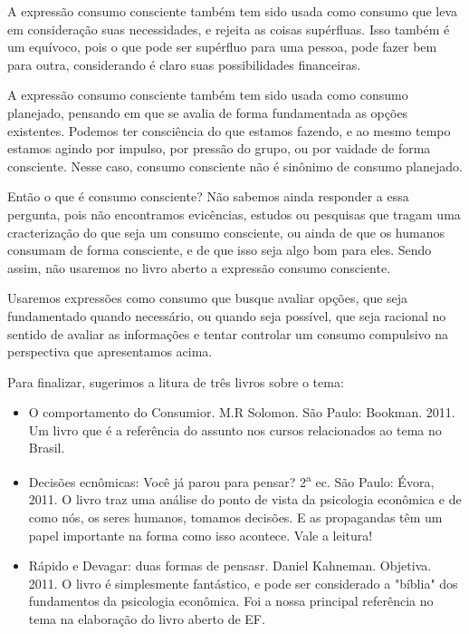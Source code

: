 \begin{paginatexto2}
\begin{itemize}
   A expressão consumo consciente também tem sido usada como consumo que leva em consideração suas necessidades, e rejeita as coisas supérfluas. Isso também é um equívoco, pois o que pode ser supérfluo para uma pessoa, pode fazer bem para outra, considerando é claro suas possibilidades financeiras.

   A expressão consumo consciente também tem sido usada como consumo planejado, pensando em que se avalia de forma fundamentada as opções existentes. Podemos ter consciência do que estamos fazendo, e ao mesmo tempo estamos agindo por impulso, por pressão do grupo, ou por vaidade de forma consciente. Nesse caso, consumo consciente não é sinônimo de consumo planejado.

   Então o que é consumo consciente? Não sabemos ainda responder a essa pergunta, pois não encontramos evicências, estudos ou pesquisas que tragam uma cracterização do que seja um consumo consciente, ou ainda de que os humanos consumam de forma consciente, e de que isso seja algo bom para eles. Sendo assim, não usaremos no livro aberto a expressão consumo consciente.

   Usaremos expressões como consumo que busque avaliar opções, que seja fundamentado quando necessário, ou quando seja possível, que seja racional no sentido de avaliar as informações e tentar controlar um consumo compulsivo na perspectiva que apresentamos acima.
\end{itemize}

   Para finalizar, sugerimos a litura de três livros sobre o tema:
  \begin{itemize}
    \item O comportamento do Consumior. M.R Solomon. São Paulo: Bookman. 2011. Um livro que é a referência do assunto nos cursos relacionados ao tema no Brasil.
    \item Decisões ecnômicas: Você já parou para pensar? 2\textsuperscript{a} ec. São Paulo: Évora, 2011. O livro traz uma análise do ponto de vista da psicologia econômica e de como nós, os seres humanos, tomamos decisões. E as propagandas têm um papel importante na forma como isso acontece. Vale a leitura!
    \item Rápido e Devagar: duas formas de pensasr. Daniel Kahneman. Objetiva. 2011. O livro é simplesmente fantástico, e pode ser considerado a "bíblia"{} dos fundamentos da psicologia econômica. Foi a nossa principal referência no tema na elaboração do livro aberto de EF.
\end{itemize}

\end{paginatexto2}

